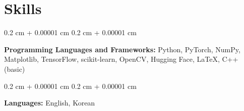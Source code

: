\documentclass[10pt, letterpaper]{article}
\newenvironment{onecolentry}{
    \begin{adjustwidth}{
        0.2 cm + 0.00001 cm
    }{
        0.2 cm + 0.00001 cm
    }
}{
    \end{adjustwidth}
} %
\begin{document}
        \vspace{0.2 cm}

 
 
    \section{Skills}
        
        \begin{onecolentry}
            \textbf{Programming Languages and Frameworks:} Python, PyTorch, NumPy, Matplotlib, TensorFlow, scikit-learn,  OpenCV, Hugging Face, \LaTeX, C++ (basic)%
        \end{onecolentry}

        \vspace{0.2 cm}

        \begin{onecolentry}
            \textbf{Languages:} English, Korean
        \end{onecolentry}

        \vspace{0.2 cm}
\end{document}
